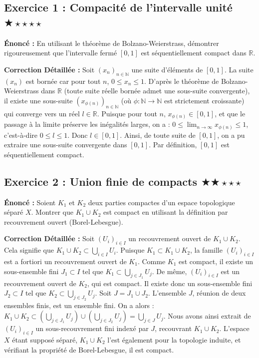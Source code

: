 \documentclass[11pt,a4paper]{article}
\begin{document}
\subsection*{Exercice 1 : Compacité de l'intervalle unité \quad $\bigstar\star\star\star\star$}

\textbf{Énoncé :} En utilisant le théorème de Bolzano-Weierstrass, démontrer rigoureusement que l'intervalle fermé $[0, 1]$ est séquentiellement compact dans $\mathbb{R}$.

\textbf{Correction Détaillée :}
Soit $(x_n)_{n \in \mathbb{N}}$ une suite d'éléments de $[0, 1]$.
La suite $(x_n)$ est bornée car pour tout $n$, $0 \le x_n \le 1$.
D'après le théorème de Bolzano-Weierstrass dans $\mathbb{R}$ (toute suite réelle bornée admet une sous-suite convergente), il existe une sous-suite $(x_{\phi(n)})_{n \in \mathbb{N}}$ (où $\phi : \mathbb{N} \to \mathbb{N}$ est strictement croissante) qui converge vers un réel $l \in \mathbb{R}$.
Puisque pour tout $n$, $x_{\phi(n)} \in [0, 1]$, et que le passage à la limite préserve les inégalités larges, on a :
$0 \le \lim_{n \to \infty} x_{\phi(n)} \le 1$, c'est-à-dire $0 \le l \le 1$.
Donc $l \in [0, 1]$.
Ainsi, de toute suite de $[0, 1]$, on a pu extraire une sous-suite convergente dans $[0, 1]$. Par définition, $[0, 1]$ est séquentiellement compact.

\subsection*{Exercice 2 : Union finie de compacts \quad $\bigstar\bigstar\star\star\star$}

\textbf{Énoncé :} Soient $K_1$ et $K_2$ deux parties compactes d'un espace topologique séparé $X$. Montrer que $K_1 \cup K_2$ est compact en utilisant la définition par recouvrement ouvert (Borel-Lebesgue).

\textbf{Correction Détaillée :}
Soit $(U_i)_{i \in I}$ un recouvrement ouvert de $K_1 \cup K_2$.
Cela signifie que $K_1 \cup K_2 \subset \bigcup_{i \in I} U_i$.
Puisque $K_1 \subset K_1 \cup K_2$, la famille $(U_i)_{i \in I}$ est a fortiori un recouvrement ouvert de $K_1$.
Comme $K_1$ est compact, il existe un sous-ensemble fini $J_1 \subset I$ tel que $K_1 \subset \bigcup_{j \in J_1} U_j$.
De même, $(U_i)_{i \in I}$ est un recouvrement ouvert de $K_2$, qui est compact. Il existe donc un sous-ensemble fini $J_2 \subset I$ tel que $K_2 \subset \bigcup_{j \in J_2} U_j$.
Soit $J = J_1 \cup J_2$. L'ensemble $J$, réunion de deux ensembles finis, est un ensemble fini.
On a alors : $K_1 \cup K_2 \subset \left( \bigcup_{j \in J_1} U_j \right) \cup \left( \bigcup_{j \in J_2} U_j \right) = \bigcup_{j \in J} U_j$.
Nous avons ainsi extrait de $(U_i)_{i \in I}$ un sous-recouvrement fini indexé par $J$, recouvrant $K_1 \cup K_2$.
L'espace $X$ étant supposé séparé, $K_1 \cup K_2$ l'est également pour la topologie induite, et vérifiant la propriété de Borel-Lebesgue, il est compact.
\end{document}
